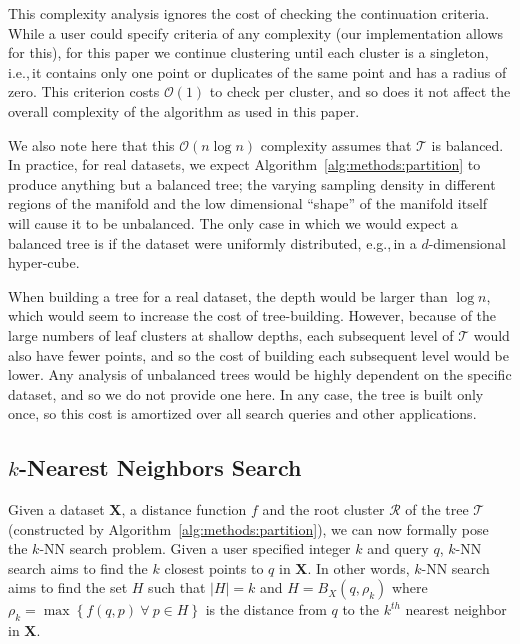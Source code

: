 This complexity analysis ignores the cost of checking the continuation criteria.
While a user could specify criteria of any complexity (our implementation allows for this), for this paper we continue clustering until each cluster is a singleton, i.e.,\,it contains only one point or duplicates of the same point and has a radius of zero.
This criterion costs $\mathcal{O}(1)$ to check per cluster, and so does it not affect the overall complexity of the algorithm as used in this paper.

We also note here that this $\mathcal{O}(n \log n)$ complexity assumes that $\mathcal{T}$ is balanced.
In practice, for real datasets, we expect Algorithm~\ref{alg:methods:partition} to produce anything but a balanced tree; the varying sampling density in different regions of the manifold and the low dimensional ``shape'' of the manifold itself will cause it to be unbalanced.
The only case in which we would expect a balanced tree is if the dataset were uniformly distributed, e.g.,\,in a $d$-dimensional hyper-cube.

When building a tree for a real dataset, the depth would be larger than $\log n$, which would seem to increase the cost of tree-building.
However, because of the large numbers of leaf clusters at shallow depths, each subsequent level of $\mathcal{T}$ would also have fewer points, and so the cost of building each subsequent level would be lower.
Any analysis of unbalanced trees would be highly dependent on the specific dataset, and so we do not provide one here.
In any case, the tree is built only once, so this cost is amortized over all search queries and other applications.


\subsection{\texorpdfstring{$k$}{k}-Nearest Neighbors Search}
\label{sec:methods:knn-search}

Given a dataset $\textbf{X}$, a distance function $f$ and the root cluster $\mathcal{R}$ of the tree $\mathcal{T}$ (constructed by Algorithm~\ref{alg:methods:partition}), we can now formally pose the $k$-NN search problem.
Given a user specified integer $k$ and query $q$, $k$-NN search aims to find the $k$ closest points to $q$ in $\textbf{X}$.
In other words, $k$-NN search aims to find the set $H$ such that $|H| = k$ and $H = B_X(q, \rho_k)$ where $\rho_k = \max \left\{ f(q, p) \ \forall \ p \in H \right\}$ is the distance from $q$ to the $k^{th}$ nearest neighbor in $\textbf{X}$.

